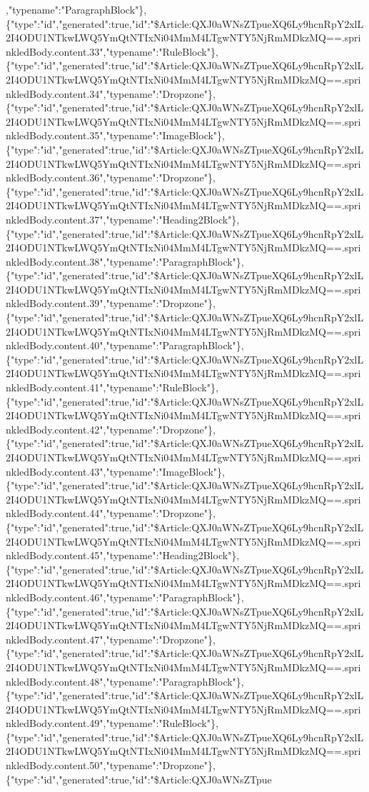 ,"typename":"ParagraphBlock"\},\{"type":"id","generated":true,"id":"\$Article:QXJ0aWNsZTpueXQ6Ly9hcnRpY2xlL2I4ODU1NTkwLWQ5YmQtNTIxNi04MmM4LTgwNTY5NjRmMDkzMQ==.sprinkledBody.content.33","typename":"RuleBlock"\},\{"type":"id","generated":true,"id":"\$Article:QXJ0aWNsZTpueXQ6Ly9hcnRpY2xlL2I4ODU1NTkwLWQ5YmQtNTIxNi04MmM4LTgwNTY5NjRmMDkzMQ==.sprinkledBody.content.34","typename":"Dropzone"\},\{"type":"id","generated":true,"id":"\$Article:QXJ0aWNsZTpueXQ6Ly9hcnRpY2xlL2I4ODU1NTkwLWQ5YmQtNTIxNi04MmM4LTgwNTY5NjRmMDkzMQ==.sprinkledBody.content.35","typename":"ImageBlock"\},\{"type":"id","generated":true,"id":"\$Article:QXJ0aWNsZTpueXQ6Ly9hcnRpY2xlL2I4ODU1NTkwLWQ5YmQtNTIxNi04MmM4LTgwNTY5NjRmMDkzMQ==.sprinkledBody.content.36","typename":"Dropzone"\},\{"type":"id","generated":true,"id":"\$Article:QXJ0aWNsZTpueXQ6Ly9hcnRpY2xlL2I4ODU1NTkwLWQ5YmQtNTIxNi04MmM4LTgwNTY5NjRmMDkzMQ==.sprinkledBody.content.37","typename":"Heading2Block"\},\{"type":"id","generated":true,"id":"\$Article:QXJ0aWNsZTpueXQ6Ly9hcnRpY2xlL2I4ODU1NTkwLWQ5YmQtNTIxNi04MmM4LTgwNTY5NjRmMDkzMQ==.sprinkledBody.content.38","typename":"ParagraphBlock"\},\{"type":"id","generated":true,"id":"\$Article:QXJ0aWNsZTpueXQ6Ly9hcnRpY2xlL2I4ODU1NTkwLWQ5YmQtNTIxNi04MmM4LTgwNTY5NjRmMDkzMQ==.sprinkledBody.content.39","typename":"Dropzone"\},\{"type":"id","generated":true,"id":"\$Article:QXJ0aWNsZTpueXQ6Ly9hcnRpY2xlL2I4ODU1NTkwLWQ5YmQtNTIxNi04MmM4LTgwNTY5NjRmMDkzMQ==.sprinkledBody.content.40","typename":"ParagraphBlock"\},\{"type":"id","generated":true,"id":"\$Article:QXJ0aWNsZTpueXQ6Ly9hcnRpY2xlL2I4ODU1NTkwLWQ5YmQtNTIxNi04MmM4LTgwNTY5NjRmMDkzMQ==.sprinkledBody.content.41","typename":"RuleBlock"\},\{"type":"id","generated":true,"id":"\$Article:QXJ0aWNsZTpueXQ6Ly9hcnRpY2xlL2I4ODU1NTkwLWQ5YmQtNTIxNi04MmM4LTgwNTY5NjRmMDkzMQ==.sprinkledBody.content.42","typename":"Dropzone"\},\{"type":"id","generated":true,"id":"\$Article:QXJ0aWNsZTpueXQ6Ly9hcnRpY2xlL2I4ODU1NTkwLWQ5YmQtNTIxNi04MmM4LTgwNTY5NjRmMDkzMQ==.sprinkledBody.content.43","typename":"ImageBlock"\},\{"type":"id","generated":true,"id":"\$Article:QXJ0aWNsZTpueXQ6Ly9hcnRpY2xlL2I4ODU1NTkwLWQ5YmQtNTIxNi04MmM4LTgwNTY5NjRmMDkzMQ==.sprinkledBody.content.44","typename":"Dropzone"\},\{"type":"id","generated":true,"id":"\$Article:QXJ0aWNsZTpueXQ6Ly9hcnRpY2xlL2I4ODU1NTkwLWQ5YmQtNTIxNi04MmM4LTgwNTY5NjRmMDkzMQ==.sprinkledBody.content.45","typename":"Heading2Block"\},\{"type":"id","generated":true,"id":"\$Article:QXJ0aWNsZTpueXQ6Ly9hcnRpY2xlL2I4ODU1NTkwLWQ5YmQtNTIxNi04MmM4LTgwNTY5NjRmMDkzMQ==.sprinkledBody.content.46","typename":"ParagraphBlock"\},\{"type":"id","generated":true,"id":"\$Article:QXJ0aWNsZTpueXQ6Ly9hcnRpY2xlL2I4ODU1NTkwLWQ5YmQtNTIxNi04MmM4LTgwNTY5NjRmMDkzMQ==.sprinkledBody.content.47","typename":"Dropzone"\},\{"type":"id","generated":true,"id":"\$Article:QXJ0aWNsZTpueXQ6Ly9hcnRpY2xlL2I4ODU1NTkwLWQ5YmQtNTIxNi04MmM4LTgwNTY5NjRmMDkzMQ==.sprinkledBody.content.48","typename":"ParagraphBlock"\},\{"type":"id","generated":true,"id":"\$Article:QXJ0aWNsZTpueXQ6Ly9hcnRpY2xlL2I4ODU1NTkwLWQ5YmQtNTIxNi04MmM4LTgwNTY5NjRmMDkzMQ==.sprinkledBody.content.49","typename":"RuleBlock"\},\{"type":"id","generated":true,"id":"\$Article:QXJ0aWNsZTpueXQ6Ly9hcnRpY2xlL2I4ODU1NTkwLWQ5YmQtNTIxNi04MmM4LTgwNTY5NjRmMDkzMQ==.sprinkledBody.content.50","typename":"Dropzone"\},\{"type":"id","generated":true,"id":"\$Article:QXJ0aWNsZTpue